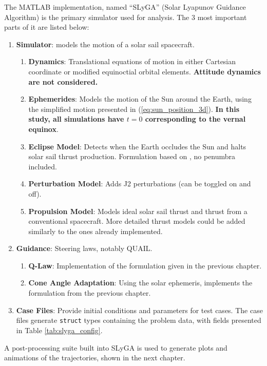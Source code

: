 The MATLAB implementation, named ``SLyGA'' (Solar Lyapunov Guidance Algorithm) is the primary simulator used for analysis. The 3 most important parts of it are listed below:
\begin{enumerate}
  \item \textbf{Simulator}: models the motion of a solar sail spacecraft.
        \begin{enumerate}
          \item \textbf{Dynamics}: Translational equations of motion in either Cartesian coordinate or modified equinoctial orbital elements. \textbf{Attitude dynamics are not considered.}
          \item \textbf{Ephemerides}: Models the motion of the Sun around the Earth, using the simplified motion presented in (\ref{eq:sun_position_3d}). \textbf{In this study, all simulations have \(t=0\) corresponding to the vernal equinox}.
          \item \textbf{Eclipse Model}: Detects when the Earth occludes the Sun and halts solar sail thrust production. Formulation based on \cite{curtis2014orbital}, no penumbra included.
          \item \textbf{Perturbation Model}: Adds J2 perturbations (can be toggled on and off).
          \item \textbf{Propulsion Model}: Models ideal solar sail thrust and thrust from a conventional spacecraft. More detailed thrust models could be added similarly to the ones already implemented.
        \end{enumerate}
  \item \textbf{Guidance}: Steering laws, notably QUAIL.
        \begin{enumerate}
          \item \textbf{Q-Law}: Implementation of the formulation given in the previous chapter.
          \item \textbf{Cone Angle Adaptation}: Using the solar ephemeris, implements the formulation from the previous chapter.
        \end{enumerate}
  \item \textbf{Case Files}: Provide initial conditions and parameters for test cases. The case files generate \verb|struct| types containing the problem data, with fields presented in Table \ref{tab:slyga_config}.
\end{enumerate}

A post-processing suite built into SLyGA is used to generate plots and animations of the trajectories, shown in the next chapter.

